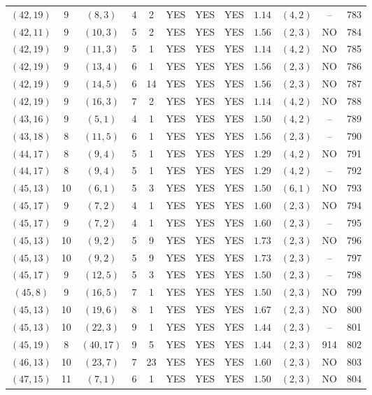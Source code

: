 \begin{longtable}{|c|c|c|c|c|c|c|c|c|c|c|c|}
$(42,19)$ & 9 & $(8,3)$ & 4 & 2 & YES & YES & YES & $1.14$ & $(4,2)$ & -- & 783\\
$(42,11)$ & 9 & $(10,3)$ & 5 & 2 & YES & YES & YES & $1.56$ & $(2,3)$ & NO & 784\\
$(42,19)$ & 9 & $(11,3)$ & 5 & 1 & YES & YES & YES & $1.14$ & $(4,2)$ & NO & 785\\
$(42,19)$ & 9 & $(13,4)$ & 6 & 1 & YES & YES & YES & $1.56$ & $(2,3)$ & NO & 786\\
$(42,19)$ & 9 & $(14,5)$ & 6 & 14 & YES & YES & YES & $1.56$ & $(2,3)$ & NO & 787\\
$(42,19)$ & 9 & $(16,3)$ & 7 & 2 & YES & YES & YES & $1.14$ & $(4,2)$ & NO & 788\\
$(43,16)$ & 9 & $(5,1)$ & 4 & 1 & YES & YES & YES & $1.50$ & $(4,2)$ & -- & 789\\
$(43,18)$ & 8 & $(11,5)$ & 6 & 1 & YES & YES & YES & $1.56$ & $(2,3)$ & -- & 790\\
$(44,17)$ & 8 & $(9,4)$ & 5 & 1 & YES & YES & YES & $1.29$ & $(4,2)$ & NO & 791\\
$(44,17)$ & 8 & $(9,4)$ & 5 & 1 & YES & YES & YES & $1.29$ & $(4,2)$ & -- & 792\\
$(45,13)$ & 10 & $(6,1)$ & 5 & 3 & YES & YES & YES & $1.50$ & $(6,1)$ & NO & 793\\
$(45,17)$ & 9 & $(7,2)$ & 4 & 1 & YES & YES & YES & $1.60$ & $(2,3)$ & NO & 794\\
$(45,17)$ & 9 & $(7,2)$ & 4 & 1 & YES & YES & YES & $1.60$ & $(2,3)$ & -- & 795\\
$(45,13)$ & 10 & $(9,2)$ & 5 & 9 & YES & YES & YES & $1.73$ & $(2,3)$ & NO & 796\\
$(45,13)$ & 10 & $(9,2)$ & 5 & 9 & YES & YES & YES & $1.73$ & $(2,3)$ & -- & 797\\
$(45,17)$ & 9 & $(12,5)$ & 5 & 3 & YES & YES & YES & $1.50$ & $(2,3)$ & -- & 798\\
$(45,8)$ & 9 & $(16,5)$ & 7 & 1 & YES & YES & YES & $1.50$ & $(2,3)$ & NO & 799\\
$(45,13)$ & 10 & $(19,6)$ & 8 & 1 & YES & YES & YES & $1.67$ & $(2,3)$ & NO & 800\\
$(45,13)$ & 10 & $(22,3)$ & 9 & 1 & YES & YES & YES & $1.44$ & $(2,3)$ & -- & 801\\
$(45,19)$ & 8 & $(40,17)$ & 9 & 5 & YES & YES & YES & $1.44$ & $(2,3)$ & 914 & 802\\
$(46,13)$ & 10 & $(23,7)$ & 7 & 23 & YES & YES & YES & $1.60$ & $(2,3)$ & NO & 803\\
$(47,15)$ & 11 & $(7,1)$ & 6 & 1 & YES & YES & YES & $1.50$ & $(2,3)$ & NO & 804\\

\end{longtable}
